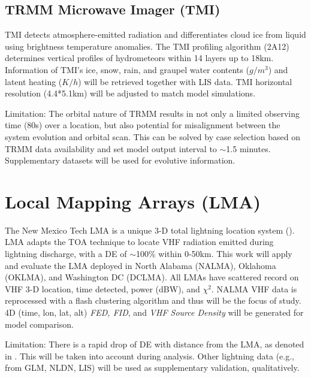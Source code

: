 \subsection{TRMM Microwave Imager (TMI)} 
TMI detects atmosphere-emitted radiation and differentiates cloud ice from liquid using brightness temperature anomalies. The TMI profiling algorithm (2A12) determines vertical profiles of hydrometeors within 14 layers up to 18km. Information of TMI's ice, snow, rain, and graupel water contents ($g/m^3$) and latent heating ($K/h$) will be retrieved together with LIS data. TMI horizontal resolution (4.4*5.1km) will be adjusted to match model simulations.

Limitation:  The orbital nature of TRMM results in not only a limited observing time (80s) over a location, but also potential for misalignment between the system evolution and orbital scan. This can be solved by case selection based on TRMM data availability and set model output interval to $\sim$1.5 minutes. Supplementary datasets will be used for evolutive information.
\section{Local Mapping Arrays (LMA)}
\label{sec:LMA}
The New Mexico Tech LMA is a unique 3-D total lightning location system (\cite{rison1999gps}). LMA adapts the TOA technique to locate VHF radiation emitted during lightning discharge, with a DE of $\sim$100\% within 0-50km. This work will apply and evaluate the LMA deployed in North Alabama (NALMA), Oklahoma (OKLMA), and Washington DC (DCLMA). All LMAs have scattered record on VHF 3-D location, time detected, power (dBW), and $\chi^2$. NALMA VHF data is reprocessed with a flash clustering algorithm and thus will be the focus of study. 4D (time, lon, lat, alt) \textit{FED, FID}, and \textit{VHF Source Density} will be generated for model comparison.

Limitation: There is a rapid drop of DE with distance from the LMA, as denoted in \cite{carey2005lightning}. This will be taken into account during analysis. Other lightning data (e.g., from GLM, NLDN, LIS) will be used as supplementary validation, qualitatively. 

